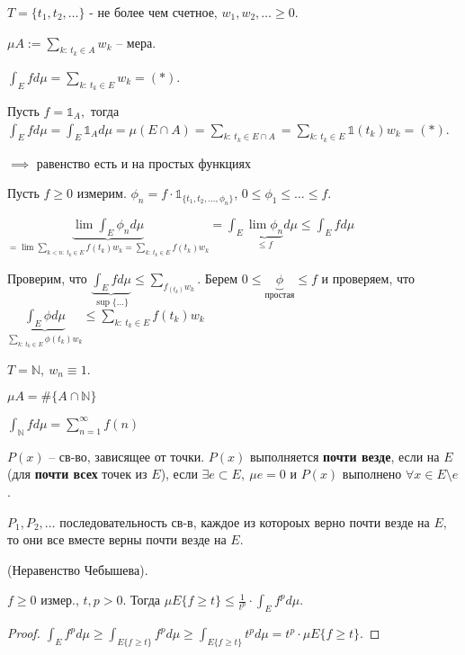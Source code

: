 \begin{example}
    $T = \{ t_1, t_2, \dots \}$ - не более чем счетное, $w_1, w_2, \dots \geq 0$.

    $\mu A := \sum_{k: \ t_k \in A}{w_k}$ -- мера.

    $\int_E{f d \mu} = \sum_{k: \ t_k \in E}{w_k} = (*)$.

    Пусть $f = \mathds{1}_A, $ тогда $\int_E{f d \mu} = \int_E{\mathds{1}_A d \mu} = \mu (E \cap A) = \sum_{k: \ t_k \in E \cap A} = \sum_{k: \ t_k \in E}{\mathds{1}(t_k) w_k} = (*)$. \newline

    $\implies$ равенство есть и на простых функциях

    Пусть $f \geq 0$ измерим. $\phi_n = f \cdot \mathds{1}_{\{ t_1, t_2, \dots, \phi_n \}}$, $0 \leq \phi_1 \leq \dots \leq f$.

    $\underbrace{\lim{\int_E{\phi_n d \mu}}}_{= \lim \sum_{k<n: \ t_k \in E}{f(t_k) w_k} = \sum_{k: \ t_k \in E}{f(t_k) w_k}} = \int_E{\underbrace{\lim{\phi_n}}_{\leq f} d \mu} \leq \int_E {f d \mu}$

    Проверим, что $\underbrace{\int_E{f d \mu}}_{\sup \{ \dots\}} \leq \sum_{f_(t_k)w_k}$. Берем $0 \leq \underbrace{\phi}_{\text{простая}} \leq f$ и проверяем, что $\underbrace{\int_E{\phi d \mu}}_{\sum_{k: \ t_k \in E}{\phi(t_k) w_k}} \leq \sum_{k: \ t_k \in E}{f(t_k)w_k}$
\end{example}
\begin{remark}
    $T = \mathbb{N}, \ w_n \equiv 1$.

    $\mu A = \#\{ A \cap \mathbb{N} \}$

    $\int_{\mathbb{N}}{f d \mu} = \sum_{n=1}^{\infty} f(n)$
\end{remark}

\begin{definition}
    $P(x)$ -- св-во, зависящее от точки. $P(x)$ выполняется \textbf{почти везде}, если на $E$ (для \textbf{почти всех} точек из $E$), если $\exists e \subset E, \ \mu e = 0$ и $P(x)$ выполнено $\forall x \in E \setminus e$.
\end{definition}

\begin{remark}
    $P_1, P_2, \dots$ последовательность св-в, каждое из котороых верно почти везде на $E$, то они все вместе верны почти везде на $E$.
\end{remark}

\begin{theorem}
    (Неравенство Чебышева).
    
    $f \geq 0$ измер., $t, p > 0$. Тогда $\mu E \{ f \geq t \} \leq \frac{1}{t^p} \cdot \int_E{f^p d \mu}$.
\end{theorem}
\begin{proof}
    $\int_E{f^p d \mu} \geq \int_{E\{ f \geq t \}}{f^p d \mu} \geq \int_{E\{ f \geq t \}}{t^p d \mu} = t^p \cdot \mu E \{ f \geq t \}$.
\end{proof}

